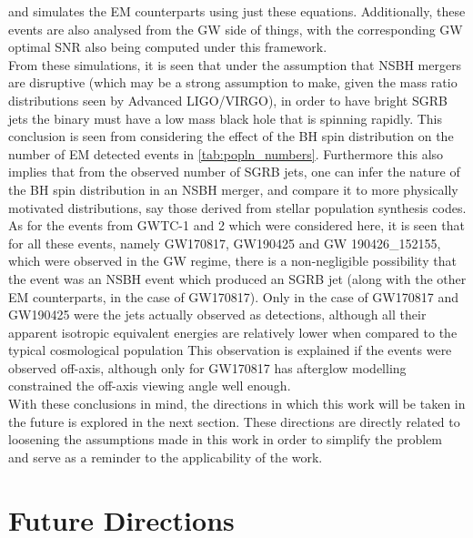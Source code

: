     and simulates the EM counterparts using just these equations. Additionally, these
    events are also analysed from the GW side of things, with the corresponding GW
    optimal SNR also being computed under this framework.\\
    From these simulations, it is seen that under the assumption that NSBH mergers are
    disruptive (which may be a strong assumption to make, given the mass ratio
    distributions seen by Advanced LIGO/VIRGO), in order to have bright SGRB jets the
    binary must have a low mass black hole that is spinning rapidly. This conclusion is
    seen from considering the effect of the BH spin distribution on the number of EM
    detected events in \ref{tab:popln_numbers}. Furthermore this also implies that from
    the observed number of SGRB jets, one can infer the nature of the BH spin
    distribution in an NSBH merger, and compare it to more physically motivated
    distributions, say those derived from stellar population synthesis codes.\\
    As for the events from GWTC-1 and 2 which were considered here, it is seen that for
    all these events, namely GW170817, GW190425 and GW 190426\_152155, which were
    observed in the GW regime, there is a non-negligible possibility that the event was
    an NSBH event which produced an SGRB jet (along with the other EM counterparts, in
    the case of GW170817). Only in the case of GW170817 and GW190425 were the jets
    actually observed as detections, although all their apparent isotropic equivalent
    energies are relatively lower when compared to the typical cosmological population
    This observation is explained if the events were observed off-axis, although only
    for GW170817 has afterglow modelling constrained the off-axis viewing angle
    well enough.\\
    With these conclusions in mind, the directions in which this work will be taken in
    the future is explored in the next section. These directions are directly related to
    loosening the assumptions made in this work in order to simplify the problem and
    serve as a reminder to the applicability of the work.

    \section{Future Directions}

